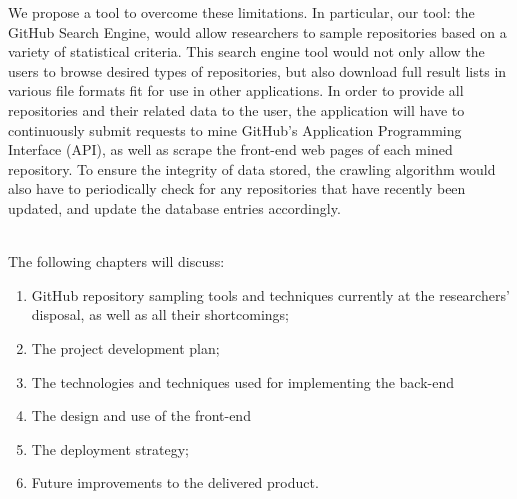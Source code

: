 \newpage

We propose a tool to overcome these limitations.
In particular, our tool: the GitHub Search Engine, would allow researchers to sample repositories based on a variety of statistical criteria.
This search engine tool would not only allow the users to browse desired types of repositories, but also download full result lists in various file formats fit for use in other applications.
In order to provide all repositories and their related data to the user, the application will have to continuously submit requests to mine GitHub's Application Programming Interface (API), as well as scrape the front-end web pages of each mined repository.
To ensure the integrity of data stored, the crawling algorithm would also have to periodically check for any repositories that have recently been updated, and update the database entries accordingly.

\mbox{}\\
The following chapters will discuss:
\begin{enumerate}
    \item GitHub repository sampling tools and techniques currently at the researchers' disposal, as well as all their shortcomings;
    \item The project development plan;
    \item The technologies and techniques used for implementing the back-end
    \item The design and use of the front-end
    \item The deployment strategy;
    \item Future improvements to the delivered product.
\end{enumerate}